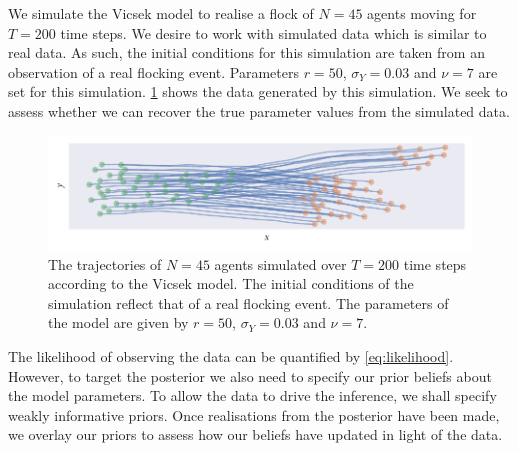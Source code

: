 We simulate the Vicsek model to realise a flock of $N=45$ agents moving for $T=200$ time
steps. We desire to work with simulated data which is similar to real data. As such, the
initial conditions for this simulation are taken from an observation of a real flocking
event. Parameters $r=50$, $\sigma_Y=0.03$ and $\nu=7$ are set for this simulation.
\cref{fig:vicsek_sim_study} shows the data generated by this simulation. We seek to assess
whether we can recover the true parameter values from the simulated data.

\begin{figure}[tb]
  \includegraphics{vicsek_sim.pdf}
  \caption{The trajectories of $N=45$ agents simulated over $T=200$ time steps according to
    the Vicsek model. The initial conditions of the simulation reflect that of a real
    flocking event. The parameters of the model are given by $r=50$, $\sigma_Y=0.03$ and
    $\nu=7$.}
  \label{fig:vicsek_sim_study}
\end{figure}

The likelihood of observing the data can be quantified by \cref{eq:likelihood}. However,
to target the posterior we also need to specify our prior beliefs about the model
parameters. To allow the data to drive the inference, we shall specify weakly informative
priors. Once realisations from the posterior have been made, we overlay our priors to
assess how our beliefs have updated in light of the data.

